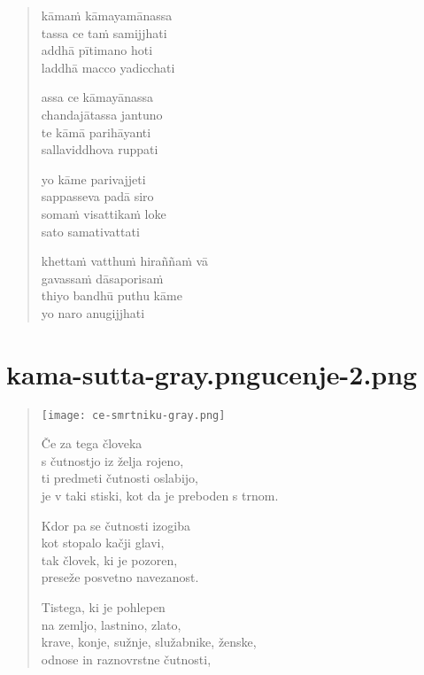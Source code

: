

\cleartoverso

\vspace*{30mm}

\begin{verse}

kāmaṁ kāmayamānassa\\
tassa ce taṁ samijjhati\\
addhā pītimano hoti\\
laddhā macco yadicchati

assa ce kāmayānassa\\
chandajātassa jantuno\\
te kāmā parihāyanti\\
sallaviddhova ruppati

yo kāme parivajjeti\\
sappasseva padā siro\\
somaṁ visattikaṁ loke\\
sato samativattati

khettaṁ vatthuṁ hiraññaṁ vā\\
gavassaṁ dāsaporisaṁ\\
thiyo bandhū puthu kāme\\
yo naro anugijjhati

\end{verse}


\chapter[Kāma Sutta]{{kama-sutta-gray.png}{ucenje-2.png}}

\begin{verse}

\vFirst
\texttt{[image: ce-smrtniku-gray.png]}

Če za tega človeka\\
s čutnostjo iz želja rojeno,\\
ti predmeti čutnosti oslabijo,\\
je v taki stiski, kot da je preboden s trnom.

Kdor pa se čutnosti izogiba\\
kot stopalo kačji glavi,\\
tak človek, ki je pozoren,\\
preseže posvetno navezanost.

Tistega, ki je pohlepen\\
na zemljo, lastnino, zlato,\\
krave, konje, sužnje, služabnike, ženske,\\
odnose in raznovrstne čutnosti,

\end{verse}

